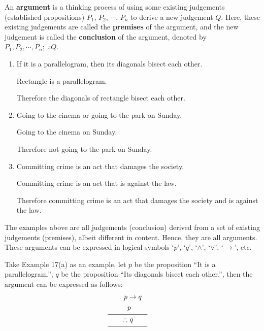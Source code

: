 \documentclass{report}
\newcounter{example}
\begin{document}
An \textbf{argument} is a thinking process of using some existing judgements
(established propositions) $P_1$, $P_2$, $\cdots$, $P_n$ to derive a new
judgement $Q$. Here, these existing judgements are called the \textbf{premises}
of the argument, and the new judgement is called the \textbf{conclusion} of the
argument, denoted by $P_1, P_2, \cdots, P_n;\ \therefore Q$. \vspace{0.5cm}

\begin{example}
    \item \begin{enumerate}[label=(\alph*), leftmargin=*]
        \item If it is a parallelogram, then its diagonals bisect each other.

              Rectangle is a parallelogram.

              Therefore the diagonals of rectangle bisect each other.

        \item Going to the cinema or going to the park on Sunday.

              Going to the cinema on Sunday.

              Therefore not going to the park on Sunday.

        \item Committing crime is an act that damages the society.

              Committing crime is an act that is against the law.

              Therefore committing crime is an act that damages the society and is against
              the law.
    \end{enumerate}
\end{example}

The examples above are all judgements (conclusion) derived from a set of
existing judgements (premises), albeit different in content. Hence, they are
all arguments. These arguments can be expressed in logical symbols `$p$',
`$q$', `$\land$', `$\lor$', `$\rightarrow$', etc.

Take Example 17(a) as an example, let $p$ be the proposition ``It is a
parallelogram.'', $q$ be the proposition ``Its diagonals bisect each other.'',
then the argument can be expressed as follows:
\begin{align*}
    p          & \rightarrow q                \\
               & p                            \\[-8pt]
               & \mathclap{\rule{2cm}{0.4pt}} \\[-5pt]
    \therefore & \ q                          \\[-8pt]
               & \mathclap{\rule{2cm}{0.4pt}}
\end{align*}
\end{document}

